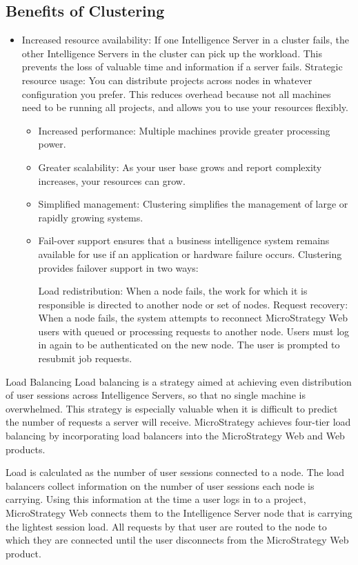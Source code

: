 \documentclass[12pt]{article}
\begin{document}
\subsection{Benefits of Clustering}
\begin{itemize}
\item
Increased resource availability: If one Intelligence Server in a cluster fails, the other Intelligence Servers in the cluster can pick up the workload. This prevents the loss of valuable time and information if a server fails.
Strategic resource usage: You can distribute projects across nodes in whatever configuration you prefer. This reduces overhead because not all machines need to be running all projects, and allows you to use your resources flexibly.
\begin{itemize}
\item
Increased performance: Multiple machines provide greater processing power.
\item
Greater scalability: As your user base grows and report complexity increases, your resources can grow.
\item
Simplified management: Clustering simplifies the management of large or rapidly growing systems.
\item
Fail-over support ensures that a business intelligence system remains available for use if an application or hardware failure occurs. Clustering provides failover support in two ways:

Load redistribution: When a node fails, the work for which it is responsible is directed to another node or set of nodes.
Request recovery: When a node fails, the system attempts to reconnect MicroStrategy Web users with queued or processing requests to another node. Users must log in again to be authenticated on the new node. The user is prompted to resubmit job requests.

\end{itemize}
\end{itemize}
Load Balancing
Load balancing is a strategy aimed at achieving even distribution of user sessions across Intelligence Servers, so that no single machine is overwhelmed. This strategy is especially valuable when it is difficult to predict the number of requests a server will receive. MicroStrategy achieves four-tier load balancing by incorporating load balancers into the MicroStrategy Web and Web products.

Load is calculated as the number of user sessions connected to a node. The load balancers collect information on the number of user sessions each node is carrying. Using this information at the time a user logs in to a project, MicroStrategy Web connects them to the Intelligence Server node that is carrying the lightest session load. All requests by that user are routed to the node to which they are connected until the user disconnects from the MicroStrategy Web product.
\end{document}
